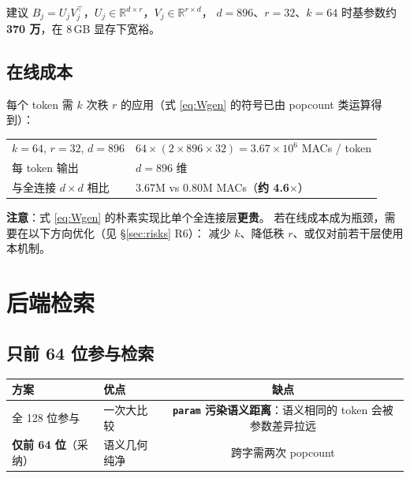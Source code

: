 \documentclass[11pt,a4paper]{ctexart}
\newcommand{\warn}[1]{\textcolor{warnred}{\textbf{#1}}}
\theoremstyle{definition}
\begin{document}
建议 $B_j = U_j V_j^{\top}$，$U_j\in\mathbb{R}^{d\times r}$，$V_j\in\mathbb{R}^{r\times d}$，
$d=896$、$r=32$、$k=64$ 时基参数约 \textbf{370 万}，在 8\,GB 显存下宽裕。

\subsection{在线成本}

每个 token 需 $k$ 次秩 $r$ 的应用（式 \eqref{eq:Wgen} 的符号已由 popcount 类运算得到）：

\begin{center}
\begin{tabularx}{\textwidth}{@{}lX@{}}
\toprule
$k=64$, $r=32$, $d=896$ & $64\times(2\times 896\times 32)=3.67\times10^{6}$ MACs / token \\
每 token 输出 & $d=896$ 维 \\
与全连接 $d\times d$ 相比 & $3.67\text{M}$ vs $0.80\text{M}$ MACs（\warn{约 4.6$\times$}）\\
\bottomrule
\end{tabularx}
\end{center}

\warn{注意}：式 \eqref{eq:Wgen} 的朴素实现比单个全连接层\textbf{更贵}。
若在线成本成为瓶颈，需要在以下方向优化（见 \S\ref{sec:risks} R6）：
减少 $k$、降低秩 $r$、或仅对前若干层使用本机制。

\section{后端检索}\label{sec:retrieval}

\subsection{只前 64 位参与检索}

\begin{center}
\begin{tabularx}{\textwidth}{@{}lXc@{}}
\toprule
\textbf{方案} & \textbf{优点} & \textbf{缺点} \\
\midrule
全 128 位参与 & 一次大比较 & \warn{\texttt{param} 污染语义距离}：语义相同的 token 会被参数差异拉远 \\
\textbf{仅前 64 位}（采纳） & 语义几何纯净 & 跨字需两次 popcount \\
\bottomrule
\end{tabularx}
\end{center}
\end{document}
